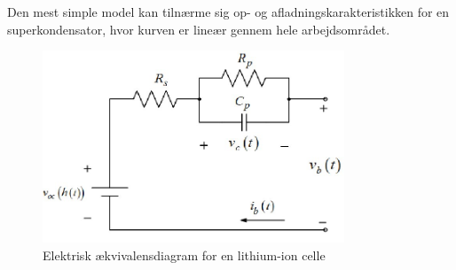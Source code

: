 Den mest simple model kan tilnærme sig op- og afladningskarakteristikken for en superkondensator, hvor kurven er lineær gennem hele arbejdsområdet. \\

\begin{figure}[h]
	\centering
	\includegraphics[width=9cm]{billeder/ecm.png}
	\caption{Elektrisk ækvivalensdiagram for en lithium-ion celle}
	\label{fig:ecm}
\end{figure}




